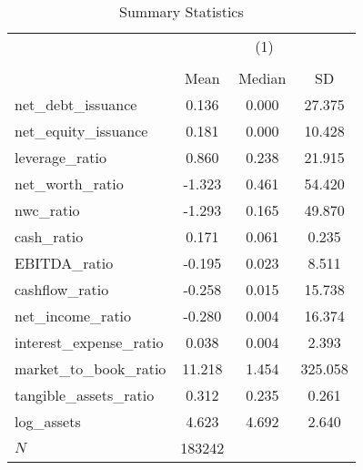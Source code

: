 \begin{table}[htbp]\centering
\def\sym#1{\ifmmode^{#1}\else\(^{#1}\)\fi}
\caption{Summary Statistics}
\begin{tabular}{l*{1}{ccc}}
\hline\hline
            &\multicolumn{3}{c}{(1)}               \\
            &\multicolumn{3}{c}{}                  \\
            &        Mean&      Median&          SD\\
\hline
net\_debt\_issuance&       0.136&       0.000&      27.375\\
net\_equity\_issuance&       0.181&       0.000&      10.428\\
leverage\_ratio&       0.860&       0.238&      21.915\\
net\_worth\_ratio&      -1.323&       0.461&      54.420\\
nwc\_ratio   &      -1.293&       0.165&      49.870\\
cash\_ratio  &       0.171&       0.061&       0.235\\
EBITDA\_ratio&      -0.195&       0.023&       8.511\\
cashflow\_ratio&      -0.258&       0.015&      15.738\\
net\_income\_ratio&      -0.280&       0.004&      16.374\\
interest\_expense\_ratio&       0.038&       0.004&       2.393\\
market\_to\_book\_ratio&      11.218&       1.454&     325.058\\
tangible\_assets\_ratio&       0.312&       0.235&       0.261\\
log\_assets  &       4.623&       4.692&       2.640\\
\hline
\(N\)       &      183242&            &            \\
\hline\hline
\end{tabular}
\end{table}

